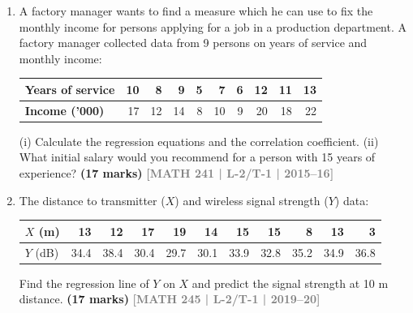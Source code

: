 \documentclass[12pt,a4paper]{article}
\newcommand{\yr}[1]{\hfill\textcolor{gray}{\small\textbf{[#1]}}}
\newcommand{\mk}[1]{\textcolor{orange!70!black}{\small\textbf{(#1 marks)}}}
\begin{document}
\begin{enumerate}
\item A factory manager wants to find a measure which he can use to fix the monthly
income for persons applying for a job in a production department. 
A factory manager collected data from 9 persons on years of service and monthly income:
\begin{center}
\begin{tabular}{lrrrrrrrrr}
\toprule
\textbf{Years of service} & 10 & 8 & 9 & 5 & 7 & 6 & 12 & 11 & 13 \\
\midrule
\textbf{Income ('000)} & 17 & 12 & 14 & 8 & 10 & 9 & 20 & 18 & 22 \\
\bottomrule
\end{tabular}
\end{center}
(i) Calculate the regression equations and the correlation coefficient. (ii) What initial salary would you recommend for a person with 15 years of experience?
\mk{17} \yr{MATH 241 | L-2/T-1 | 2015--16}

\item The distance to transmitter ($X$) and wireless signal strength ($Y$) data:
\begin{center}
\begin{tabular}{lrrrrrrrrrr}
\toprule
$X$ (m) & 13 & 12 & 17 & 19 & 14 & 15 & 15 & 8 & 13 & 3 \\
\midrule
$Y$ (dB) & 34.4 & 38.4 & 30.4 & 29.7 & 30.1 & 33.9 & 32.8 & 35.2 & 34.9 & 36.8 \\
\bottomrule
\end{tabular}
\end{center}
Find the regression line of $Y$ on $X$ and predict the signal strength at 10 m distance.
\mk{17} \yr{MATH 245 | L-2/T-1 | 2019--20}



\end{enumerate}
\end{document}
